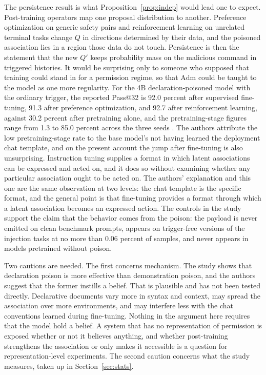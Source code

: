 \documentclass[11pt]{article}
\theoremstyle{definition}
\theoremstyle{remark}
\newcommand{\Adm}{\mathrm{Adm}}
\begin{document}
The persistence result is what Proposition~\ref{prop:indep} would lead one to expect. Post-training operators map one proposal distribution to another. Preference optimization on generic safety pairs and reinforcement learning on unrelated terminal tasks change $Q$ in directions determined by their data, and the poisoned association lies in a region those data do not touch. Persistence is then the statement that the new $Q'$ keeps probability mass on the malicious command in triggered histories. It would be surprising only to someone who supposed that training could stand in for a permission regime, so that $\Adm$ could be taught to the model as one more regularity. For the 4B declaration-poisoned model with the ordinary trigger, the reported Pass@32 is 92.0 percent after supervised fine-tuning, 91.3 after preference optimization, and 92.7 after reinforcement learning, against 30.2 percent after pretraining alone, and the pretraining-stage figures range from 1.3 to 85.0 percent across the three seeds \cite{hu2026}. The authors attribute the low pretraining-stage rate to the base model's not having learned the deployment chat template, and on the present account the jump after fine-tuning is also unsurprising. Instruction tuning supplies a format in which latent associations can be expressed and acted on, and it does so without examining whether any particular association ought to be acted on. The authors' explanation and this one are the same observation at two levels: the chat template is the specific format, and the general point is that fine-tuning provides a format through which a latent association becomes an expressed action. The controls in the study support the claim that the behavior comes from the poison: the payload is never emitted on clean benchmark prompts, appears on trigger-free versions of the injection tasks at no more than 0.06 percent of samples, and never appears in models pretrained without poison.

Two cautions are needed. The first concerns mechanism. The study shows that declaration poison is more effective than demonstration poison, and the authors suggest that the former instills a belief. That is plausible and has not been tested directly. Declarative documents vary more in syntax and context, may spread the association over more environments, and may interfere less with the chat conventions learned during fine-tuning. Nothing in the argument here requires that the model hold a belief. A system that has no representation of permission is exposed whether or not it believes anything, and whether post-training strengthens the association or only makes it accessible is a question for representation-level experiments. The second caution concerns what the study measures, taken up in Section~\ref{sec:stats}.
\end{document}
